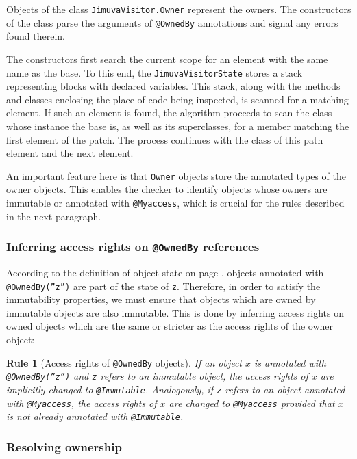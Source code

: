 \documentclass{pracamgr}
\theoremstyle{break}
\theoremstyle{break}
\theoremstyle{break}
\newtheorem{verrule}{Rule}
\begin{document}
Objects of the class
\texttt{JimuvaVisitor.Owner} represent the owners. The constructors of
the class parse the arguments of \texttt{@OwnedBy} annotations and
signal any errors found therein.

The constructors first search the current scope for an element with
the same name as the base. To this end, the
\texttt{JimuvaVisitorState} stores a stack representing blocks with
declared variables. This stack, along with the methods and classes
enclosing the place of code being inspected, is scanned for a
matching element. If such an element is found, the algorithm proceeds
to scan the class whose instance the base is, as well as its
superclasses, for a member matching the first element of the
patch. The process continues with the class of this path element and
the next element.

An important feature here is that \texttt{Owner} objects store the
annotated types of the owner objects. This enables the checker to
identify objects whose owners are immutable or annotated with
\texttt{@Myaccess}, which is crucial for the rules described in the
next paragraph.

\subsubsection{Inferring access rights on \texttt{@OwnedBy} references} 

According to the definition of object state on page
\pageref{def:state}, objects annotated with \texttt{@OwnedBy(''z'')}
are part of the state of \texttt{z}. Therefore, in order to satisfy
the immutability properties, we must ensure that objects which are
owned by immutable objects are also immutable. This is done by
inferring access rights on owned objects which are the same or
stricter as the access rights of the owner object:

\begin{verrule}[Access rights of \texttt{@OwnedBy} objects]
  If an object $x$ is annotated with \texttt{@OwnedBy(''z'')} and
  \texttt{z} refers to an immutable object, the access rights of $x$
  are implicitly changed to \texttt{@Immutable}. Analogously, if
  \texttt{z} refers to an object annotated with \texttt{@Myaccess},
  the access rights of $x$ are changed to \texttt{@Myaccess} provided
  that $x$ is not already annotated with \texttt{@Immutable}.
\end{verrule}
\vspace{-0.7cm}

\subsubsection{Resolving ownership} 
\end{document}
